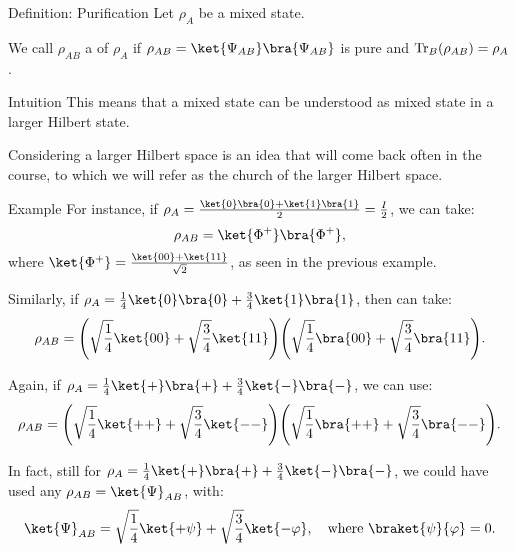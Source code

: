 \documentclass[a4paper]{article}
\begin{document}
\begin{parag}{Definition: Purification}
    Let $\rho_{A}$ be a mixed state.

    We call $\rho_{AB}$ a  of $\rho_A$ if $\rho_{AB} = \ket{\Psi_{AB}}\bra{\Psi_{AB}}$ is pure and $\Tr_B\left(\rho_{AB}\right) = \rho_A$.

    \begin{subparag}{Intuition}
        This means that a mixed state can be understood as mixed state in a larger Hilbert state.

        Considering a larger Hilbert space is an idea that will come back often in the course, to which we will refer as the church of the larger Hilbert space.
    \end{subparag}

    \begin{subparag}{Example}
        For instance, if $\rho_A = \frac{\ket{0}\bra{0} + \ket{1}\bra{1}}{2} = \frac{I}{2}$, we can take:
        \[\rho_{AB} = \ket{\Phi^+}\bra{\Phi^+},\]
        where $\ket{\Phi^+} = \frac{\ket{00} + \ket{11}}{\sqrt{2}}$, as seen in the previous example.

        Similarly, if $\rho_A = \frac{1}{4} \ket{0}\bra{0} + \frac{3}{4} \ket{1}\bra{1}$, then can take: 
        \[\rho_{AB} = \left(\sqrt{\frac{1}{4}}\ket{00} + \sqrt{\frac{3}{4}} \ket{11}\right)\left(\sqrt{\frac{1}{4}} \bra{00} + \sqrt{\frac{3}{4}} \bra{11}\right).\]

        Again, if $\rho_{A} = \frac{1}{4} \ket{+}\bra{+} + \frac{3}{4} \ket{-}\bra{-}$, we can use: 
        \[\rho_{AB} = \left(\sqrt{\frac{1}{4}} \ket{++} + \sqrt{\frac{3}{4}} \ket{--}\right)\left(\sqrt{\frac{1}{4}} \bra{++} + \sqrt{\frac{3}{4}} \bra{--}\right).\]
        
        In fact, still for $\rho_{A} = \frac{1}{4} \ket{+}\bra{+} + \frac{3}{4} \ket{-}\bra{-}$, we could have used any $\rho_{AB} = \ket{\Psi}_{AB}$, with: 
        \[\ket{\Psi}_{AB} = \sqrt{\frac{1}{4}} \ket{+ \psi} + \sqrt{\frac{3}{4}} \ket{- \phi}, \mathspace \text{where } \braket{\psi}{\phi} = 0.\]
    \end{subparag}
\end{parag}
\end{document}
